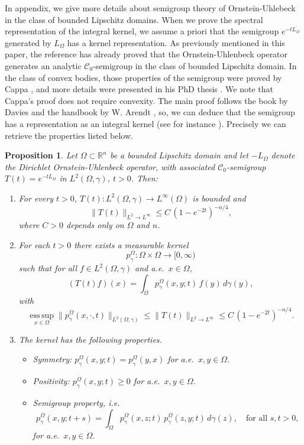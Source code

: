 \documentclass[12pt]{amsart}
\newtheorem{proposition}[theorem]{Proposition}
\newcommand{\1}{\mathbf 1}
\begin{document}
In appendix, we give more details about semigroup theory of Ornstein-Uhlebeck in the class of bounded Lipschitz domains. When we prove the spectral representation of the integral kernel, we assume a priori that the semigroup $e^{-tL_\Omega}$ generated by $L_\Omega$ has a kernel representation. As previously mentioned in this paper, the reference \cite[pages 424-428]{Wood} has already proved that the Ornstein-Uhlenbeck operator generates an analytic $\mathcal{C}_0$-semigroup in the class of bounded Lipschitz domain. In the class of convex bodies, those properties of the semigroup were proved by Cappa \cite{Cappa2019}, and more details were presented in his PhD thesis \cite{Cappa2019-2}. We note that Cappa's proof does not require convexity. The main proof follows the book by Davies \cite{DaviesBook} and the handbook by W. Arendt \cite[Chapter 7]{Arendt-handbook}, so, we can deduce that the semigroup has a representation as an integral kernel (see for instance \cite[Page 422, Theorem 2.18]{Wood}). Precisely we can retrieve the properties listed below.

\begin{proposition}
Let $\Omega\subset\mathbb{R}^n$ be a bounded Lipschitz domain and let $-L_\Omega$ denote the Dirichlet Ornstein-Uhlenbeck operator, with associated $\mathcal{C}_0$-semigroup $T(t)=e^{-tL_\Omega}$ in $L^2(\Omega,\gamma)$, $t>0$. Then:
\begin{enumerate}
    \item For every $t>0$, $T(t):L^2(\Omega,\gamma)\to L^\infty(\Omega)$ is bounded and
    \[
    \|T(t)\|_{L^2\to L^\infty} \le C\,{(1-e^{-2t})}^{-n/4},
    \]
    where $C>0$ depends only on $\Omega$ and $n$.
    \item For each $t>0$ there exists a measurable kernel
    \[
    p^{\Omega}_\gamma:\Omega\times\Omega\to [0,\infty)
    \]
    such that for all $f\in L^2(\Omega,\gamma)$ and a.e.\ $x\in\Omega$,
    \[
    (T(t)f)(x) = \int_\Omega p^{\Omega}_\gamma(x,y;t)\, f(y)\,d\gamma(y),
    \]
    with
    \[
    \operatorname*{ess\,sup}_{x\in\Omega} \|p^{\Omega}_\gamma(x,\cdot,t)\|_{L^2(\Omega,\gamma)} \le \|T(t)\|_{L^2\to L^\infty} \le C\, {(1-e^{-2t})}^{-n/4}.
    \]
    \item The kernel has the following properties.
    \begin{itemize}
        \item Symmetry: $p^\Omega_\gamma(x,y;t)=p^\Omega_\gamma(y,x)$ for a.e.\ $x,y\in\Omega$.
        \item Positivity: $p^\Omega_\gamma(x,y;t)\ge 0$ for a.e.\ $x,y\in\Omega$.
        \item Semigroup property, i.e.
        \[
        p^\Omega_\gamma(x,y;t+s) = \int_\Omega p^\Omega_\gamma(x,z;t)\,p^\Omega_\gamma(z,y;t)\,d\gamma(z), \quad \text{for all } s,t>0,
        \]
        for a.e.\ $x,y\in\Omega$.
    \end{itemize}
\end{enumerate}
\end{proposition}
\end{document}

